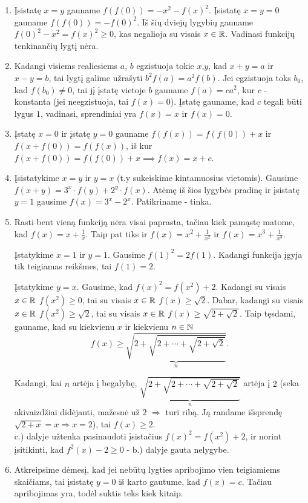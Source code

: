 \begin{enumerate}
\item
    Įsistatę $x=y$ gauname $f(f(0)) = -x^2 - f(x)^2$. Įsistatę $x=y=0$
    gauname $f(f(0)) = -f(0)^2$. Iš šių dviejų lygybių gauname $f(0)^2 -
    x^2 = f(x)^2 \geq 0$, kas negalioja su visais $x \in \mathbb R$. Vadinasi
    funkcijų tenkinančių lygtį nėra.
\item
    Kadangi visiems realiesiems $a$, $b$ egzistuoja tokie $x$,$y$, kad
    $x+y=a$ ir $x-y=b$, tai lygtį galime užrašyti $b^2f(a)=a^2f(b)$. Jei
    egzistuoja toks $b_0$, kad $f(b_0) \neq 0$, tai jį įstatę vietoje $b$
    gauname $f(a)=ca^2$, kur $c$ - konstanta (jei neegzistuoja, tai
    $f(x)=0$). Įstatę gauname, kad $c$ tegali būti lygus $1$, vadinasi,
    sprendiniai yra $f(x)=x$ ir $f(x)=0$.
\item
    Įstatę $x=0$ ir įstatę $y=0$ gauname $f(f(x))=f(f(0)) +x$ ir
    $f(x+f(0))=f(f(x))$, iš kur $f(x+f(0))=f(f(0))+x\implies
    f(x)=x+c$.
\item
    Įsistatykime $x=y$ ir $y=x$ (t.y sukeiskime kintamuosius vietomis).
    Gausime $f(x+y)=3^x\cdot f(y)+2^y\cdot f(x)$. Atėmę iš šios lygybės
    pradinę ir įsistatę $y=1$ gausime $f(x) = 3^x-2^x$. Patikriname -
    tinka.
\item
    Rasti bent vieną funkciją nėra visai paprasta, tačiau kiek pamąstę
    matome, kad $f(x)=x+\frac{1}{x}$. Taip pat tiks ir
    $f(x)=x^2+\frac{1}{x^2}$ ir $f(x)=x^3+\frac{1}{x^3}$.
    
    Įstatykime $x=1$ ir $y=1$. Gausime $f(1)^2=2f(1)$. Kadangi funkcija
    įgyja tik teigiamas reikšmes, tai $f(1)=2$.
    
    Įstatykime $y=x$. Gausime, kad $f(x)^2 = f(x^2) + 2$. Kadangi su
    visais $x\in \mathbb R$ $f(x^2)\geq 0$, tai su visais $x \in \mathbb R$ $f(x)\geq
    \sqrt{2}$. Dabar, kadangi su visais $x\in \mathbb R$ $f(x^2)\geq \sqrt{2}$,
    tai su visais $x \in \mathbb R$ $f(x)\geq \sqrt{2+\sqrt{2}}$. Taip tęsdami,
    gauname, kad su kiekvienu $x$ ir kiekvienu $n\in \mathbb N$ $$f(x)\geq
    \underbrace{\sqrt{2+\sqrt{2+\cdots +\sqrt{2+\sqrt{2}}}}}_{n}.$$
    
    Kadangi, kai $n$ artėja į begalybę, $\underbrace{\sqrt{2+\sqrt{2+\cdots
    +\sqrt{2+\sqrt{2}}}}}_{n}$ artėja į $2$ (seka akivaizdžiai didėjanti,
    mažesnė už $2$ $\Rightarrow$ turi ribą. Ją randame išsprendę
    $\sqrt{2+x}=x \Rightarrow x=2$), tai $f(x) \geq 2$.  \\
    c.) dalyje užtenka pasinaudoti įsistačius $f(x)^2 = f(x^2) + 2$,
    ir norint įsitikinti, kad $f^2(x)-2\geq 0$ - b.) dalyje gauta nelygybe.
\item
    Atkreipsime dėmesį, kad jei nebūtų lygties apribojimo vien teigiamiems
    skaičiams, tai įsistatę $y = 0$ iš karto gautume, kad $f(x)=c$. Tačiau
    apribojimas yra, todėl suktis teks kiek kitaip.
    

\end{enumerate}
